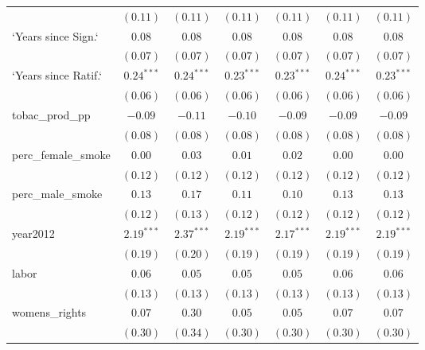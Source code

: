 \begin{table}[!h]
\begin{center}
\begin{tabular}{l c c c c c c }
                        & $(0.11)$     & $(0.11)$     & $(0.11)$     & $(0.11)$     & $(0.11)$     & $(0.11)$     \\
`Years since Sign.`     & $0.08$       & $0.08$       & $0.08$       & $0.08$       & $0.08$       & $0.08$       \\
                        & $(0.07)$     & $(0.07)$     & $(0.07)$     & $(0.07)$     & $(0.07)$     & $(0.07)$     \\
`Years since Ratif.`    & $0.24^{***}$ & $0.24^{***}$ & $0.23^{***}$ & $0.23^{***}$ & $0.24^{***}$ & $0.23^{***}$ \\
                        & $(0.06)$     & $(0.06)$     & $(0.06)$     & $(0.06)$     & $(0.06)$     & $(0.06)$     \\
tobac\_prod\_pp         & $-0.09$      & $-0.11$      & $-0.10$      & $-0.09$      & $-0.09$      & $-0.09$      \\
                        & $(0.08)$     & $(0.08)$     & $(0.08)$     & $(0.08)$     & $(0.08)$     & $(0.08)$     \\
perc\_female\_smoke     & $0.00$       & $0.03$       & $0.01$       & $0.02$       & $0.00$       & $0.00$       \\
                        & $(0.12)$     & $(0.12)$     & $(0.12)$     & $(0.12)$     & $(0.12)$     & $(0.12)$     \\
perc\_male\_smoke       & $0.13$       & $0.17$       & $0.11$       & $0.10$       & $0.13$       & $0.13$       \\
                        & $(0.12)$     & $(0.13)$     & $(0.12)$     & $(0.12)$     & $(0.12)$     & $(0.12)$     \\
year2012                & $2.19^{***}$ & $2.37^{***}$ & $2.19^{***}$ & $2.17^{***}$ & $2.19^{***}$ & $2.19^{***}$ \\
                        & $(0.19)$     & $(0.20)$     & $(0.19)$     & $(0.19)$     & $(0.19)$     & $(0.19)$     \\
labor                   & $0.06$       & $0.05$       & $0.05$       & $0.05$       & $0.06$       & $0.06$       \\
                        & $(0.13)$     & $(0.13)$     & $(0.13)$     & $(0.13)$     & $(0.13)$     & $(0.13)$     \\
womens\_rights          & $0.07$       & $0.30$       & $0.05$       & $0.05$       & $0.07$       & $0.07$       \\
                        & $(0.30)$     & $(0.34)$     & $(0.30)$     & $(0.30)$     & $(0.30)$     & $(0.30)$     \\

\end{tabular}
\end{center}
\end{table}
